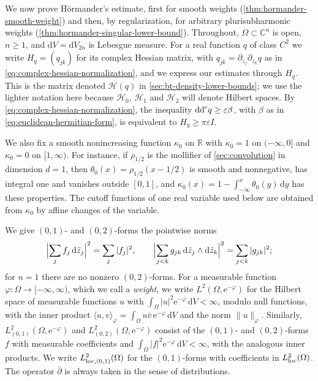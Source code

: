 We now prove H\"ormander's estimate, first for smooth weights (\cref{thm:hormander-smooth-weight}) and then, by regularization, for arbitrary plurisubharmonic weights (\cref{thm:hormander-singular-lower-bound}). Throughout, $\Omega\subset\mathbb C^n$ is open, $n\ge1$, and $\mathrm dV=\mathrm dV_{2n}$ is Lebesgue measure. For a real function $q$ of class $C^2$ we write $H_q=(q_{j\bar k})$ for its complex Hessian matrix, with $q_{j\bar k}=\partial_{z_j}\partial_{\bar z_k}q$ as in \eqref{eq:complex-hessian-normalization}, and we express our estimates through $H_q$. This is the matrix denoted $\mathcal H(q)$ in \cref{sec:bt-density-lower-bounds}; we use the lighter notation here because $\mathcal H_0$, $\mathcal H_1$ and $\mathcal H_2$ will denote Hilbert spaces. By \eqref{eq:complex-hessian-normalization}, the inequality $\mathrm{dd}^{\mathrm{c}} q\ge\varepsilon\beta$, with $\beta$ as in \eqref{eq:euclidean-hermitian-form}, is equivalent to $H_q\ge\pi\varepsilon I$.

We also fix a smooth nonincreasing function $\kappa_0$ on $\mathbb R$ with $\kappa_0=1$ on $(-\infty,0]$ and $\kappa_0=0$ on $[1,\infty)$. For instance, if $\rho_{1/2}$ is the mollifier of \cref{sec:convolution} in dimension $d=1$, then $\theta_0(x)=\rho_{1/2}(x-1/2)$ is smooth and nonnegative, has integral one and vanishes outside $[0,1]$, and $\kappa_0(x)=1-\int_{-\infty}^x\theta_0(y)\,\mathrm dy$ has these properties. The cutoff functions of one real variable used below are obtained from $\kappa_0$ by affine changes of the variable.

We give $(0,1)$- and $(0,2)$-forms the pointwise norms
\[
 \Bigl|\sum_jf_j\,\mathrm d\bar z_j\Bigr|^2=\sum_j|f_j|^2,\qquad
 \Bigl|\sum_{j<k}g_{jk}\,\mathrm d\bar z_j\wedge\mathrm d\bar z_k\Bigr|^2=\sum_{j<k}|g_{jk}|^2;
\]
for $n=1$ there are no nonzero $(0,2)$-forms. For a measurable function $\varphi\colon\Omega\to[-\infty,\infty)$, which we call a \emph{weight}, we write $L^2(\Omega,\mathrm e^{-\varphi})$ for the Hilbert space of measurable functions $u$ with $\int_\Omega|u|^2\mathrm e^{-\varphi}\,\mathrm dV<\infty$, modulo null functions, with the inner product $\langle u,v\rangle_\varphi=\int_\Omega u\bar v\,\mathrm e^{-\varphi}\,\mathrm dV$ and the norm $\|u\|_\varphi$. Similarly, $L^2_{(0,1)}(\Omega,\mathrm e^{-\varphi})$ and $L^2_{(0,2)}(\Omega,\mathrm e^{-\varphi})$ consist of the $(0,1)$- and $(0,2)$-forms $f$ with measurable coefficients and $\int_\Omega|f|^2\mathrm e^{-\varphi}\,\mathrm dV<\infty$, with the analogous inner products. We write $L^2_{\mathrm{loc},(0,1)}(\Omega)$ for the $(0,1)$-forms with coefficients in $L^2_{\mathrm{loc}}(\Omega)$. The operator $\bar\partial$ is always taken in the sense of distributions.

